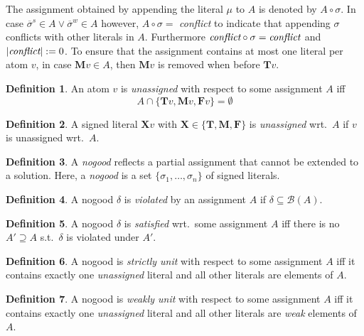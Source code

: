 \documentclass{vutinfth} %
\theoremstyle{example}
\theoremstyle{definition}
\newtheorem{definition}{Definition}[section]
\theoremstyle{theorem}
\theoremstyle{lemma}
\theoremstyle{corollary}
\newcommand{\negstrong}[1]{\overline{#1}^s}
\newcommand{\negweak}[1]{\overline{#1}^w}
\newcommand{\bass}{\mathcal{B}}
\newcommand{\ass}{A}
\newcommand{\bT}{\mathbf{T}}
\newcommand{\bM}{\mathbf{M}}
\newcommand{\bF}{\mathbf{F}}
\newcommand{\bX}{\mathbf{X}}
\newcommand{\sgl}{\mu}
\newcommand{\bsgl}{\sigma}
\newcommand{\thrice}{{\{\bT, \bM, \bF \}}}
\begin{document}
The assignment obtained by appending the literal $\sgl$ to $\ass$ is denoted by $\ass \circ \sigma$. In case $\negstrong{\sigma} \in \ass \vee \negweak{\sigma} \in \ass$ however, $\ass \circ \sigma =$ \emph{conflict} to indicate that appending $\sigma$ conflicts with other literals in $\ass$. Furthermore $\emph{conflict} \circ \sigma = \emph{conflict}$ and $|\emph{conflict}| := 0$. To ensure that the assignment contains at most one literal per atom $v$, in case $\bM v \in \ass$, then $\bM v$ is removed when before $\bT v$.

\begin{definition}
An atom $v$ is \emph{unassigned} with respect to some assignment $\ass$ iff $$\ass \cap \{\bT v, \bM v, \bF v \} = \emptyset$$
\end{definition}

\begin{definition}
A signed literal $\bX v$ with $\bX \in \thrice$ is \emph{unassigned} wrt.~$\ass$ if $v$ is unassigned wrt.~$\ass$.
\end{definition}

\begin{definition}
A \emph{nogood} reflects a partial assignment that cannot be extended to a solution. Here, a \emph{nogood} is a set $\{ \bsgl_1, \ldots, \bsgl_n \}$ of signed literals.
\end{definition}

\begin{definition}
A nogood $\delta$ is \emph{violated} by an assignment $\ass$ if $\delta \subseteq \bass(\ass)$.
\end{definition}

\begin{definition}
A nogood $\delta$ is \emph{satisfied} wrt.~some assignment $\ass$ iff there is no $\ass' \supseteq \ass$ s.t.~$\delta$ is violated under $\ass'$.
\end{definition}

\begin{definition}
A nogood is \emph{strictly unit} with respect to some assignment $\ass$ iff it contains exactly one \emph{unassigned} literal and all other literals are elements of $\ass$.
\end{definition}

\begin{definition}
A nogood is \emph{weakly unit} with respect to some assignment $\ass$ iff it contains exactly one \emph{unassigned} literal and all other literals are \emph{weak} elements of $\ass$.
\end{definition}
\end{document}
